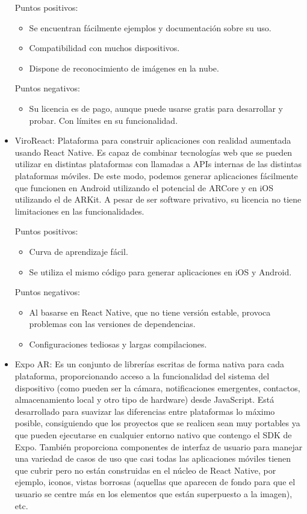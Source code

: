 \begin{itemize}
    Puntos positivos:
    \begin{itemize}
        \item Se encuentran fácilmente ejemplos y documentación sobre su uso.
        \item Compatibilidad con muchos dispositivos.
        \item Dispone de reconocimiento de imágenes en la nube.
    \end{itemize}
    Puntos negativos:
    \begin{itemize}
        \item Su licencia es de pago, aunque puede usarse gratis para desarrollar y
        probar. Con límites en su funcionalidad.
    \end{itemize}


    \item ViroReact\cite{viroreact}:
    Plataforma para construir aplicaciones con realidad aumentada usando
    React Native. Es capaz de combinar tecnologías web que se pueden utilizar
    en distintas plataformas con llamadas a APIs internas de las distintas
    plataformas móviles. De este modo, podemos generar aplicaciones fácilmente
    que funcionen en Android utilizando el potencial de ARCore y en iOS
    utilizando el de ARKit.
    A pesar de ser software privativo, su licencia no tiene limitaciones en
    las funcionalidades.

    Puntos positivos:
    \begin{itemize}
        \item Curva de aprendizaje fácil.
        \item Se utiliza el mismo código para generar aplicaciones en iOS y
        Android.
    \end{itemize}
    Puntos negativos:
    \begin{itemize}
        \item Al basarse en React Native, que no tiene versión estable,
        provoca problemas con las versiones de dependencias.
        \item Configuraciones tediosas y largas compilaciones.
    \end{itemize}


    \item Expo AR\cite{expoar}:
    Es un conjunto de librerías escritas de forma nativa para cada plataforma,
    proporcionando acceso a la funcionalidad del sistema del
    dispositivo (como pueden ser la cámara, notificaciones emergentes,
    contactos, almacenamiento local y otro tipo de hardware) desde JavaScript.
    Está desarrollado para suavizar las diferencias entre plataformas lo máximo
    posible, consiguiendo que los proyectos que se realicen sean muy portables
    ya que pueden ejecutarse en cualquier entorno nativo que contengo el SDK de
    Expo.
    También proporciona componentes de interfaz de usuario para manejar una
    variedad de casos de uso que casi todas las aplicaciones móviles tienen que
    cubrir pero no están construidas en el núcleo de React Native, por ejemplo,
    iconos, vistas borrosas (aquellas que aparecen de fondo para que el usuario
    se centre más en los elementos que están superpuesto a la imagen), etc.


\end{itemize}
